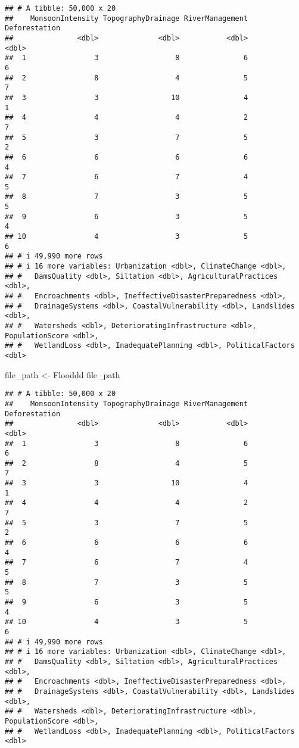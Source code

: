 \documentclass[
]{article}
\newenvironment{Shaded}{\begin{snugshade}}{\end{snugshade}}
\newcommand{\NormalTok}[1]{#1}
\newcommand{\OtherTok}[1]{\textcolor[rgb]{0.56,0.35,0.01}{#1}}
\begin{document}
\begin{verbatim}
## # A tibble: 50,000 x 20
##    MonsoonIntensity TopographyDrainage RiverManagement Deforestation
##               <dbl>              <dbl>           <dbl>         <dbl>
##  1                3                  8               6             6
##  2                8                  4               5             7
##  3                3                 10               4             1
##  4                4                  4               2             7
##  5                3                  7               5             2
##  6                6                  6               6             4
##  7                6                  7               4             5
##  8                7                  3               5             5
##  9                6                  3               5             4
## 10                4                  3               5             6
## # i 49,990 more rows
## # i 16 more variables: Urbanization <dbl>, ClimateChange <dbl>,
## #   DamsQuality <dbl>, Siltation <dbl>, AgriculturalPractices <dbl>,
## #   Encroachments <dbl>, IneffectiveDisasterPreparedness <dbl>,
## #   DrainageSystems <dbl>, CoastalVulnerability <dbl>, Landslides <dbl>,
## #   Watersheds <dbl>, DeterioratingInfrastructure <dbl>, PopulationScore <dbl>,
## #   WetlandLoss <dbl>, InadequatePlanning <dbl>, PoliticalFactors <dbl>
\end{verbatim}

\begin{Shaded}
\begin{Highlighting}[]
\NormalTok{file\_path }\OtherTok{\textless{}{-}}\NormalTok{ Flooddd}
\NormalTok{file\_path}
\end{Highlighting}
\end{Shaded}

\begin{verbatim}
## # A tibble: 50,000 x 20
##    MonsoonIntensity TopographyDrainage RiverManagement Deforestation
##               <dbl>              <dbl>           <dbl>         <dbl>
##  1                3                  8               6             6
##  2                8                  4               5             7
##  3                3                 10               4             1
##  4                4                  4               2             7
##  5                3                  7               5             2
##  6                6                  6               6             4
##  7                6                  7               4             5
##  8                7                  3               5             5
##  9                6                  3               5             4
## 10                4                  3               5             6
## # i 49,990 more rows
## # i 16 more variables: Urbanization <dbl>, ClimateChange <dbl>,
## #   DamsQuality <dbl>, Siltation <dbl>, AgriculturalPractices <dbl>,
## #   Encroachments <dbl>, IneffectiveDisasterPreparedness <dbl>,
## #   DrainageSystems <dbl>, CoastalVulnerability <dbl>, Landslides <dbl>,
## #   Watersheds <dbl>, DeterioratingInfrastructure <dbl>, PopulationScore <dbl>,
## #   WetlandLoss <dbl>, InadequatePlanning <dbl>, PoliticalFactors <dbl>
\end{verbatim}
\end{document}
